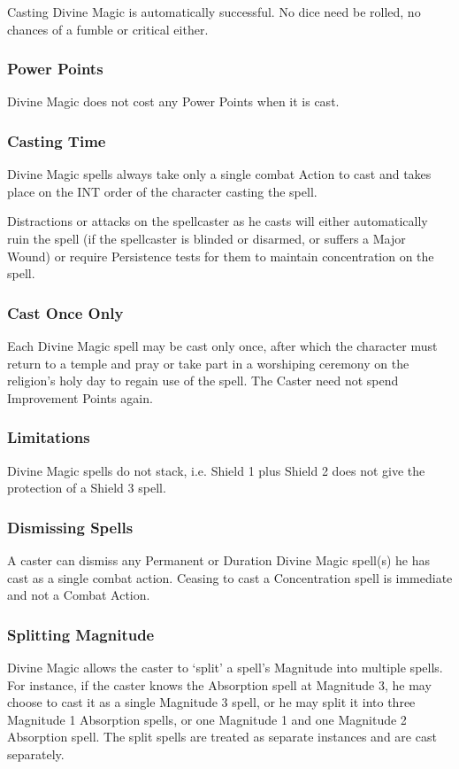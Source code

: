 Casting Divine Magic is automatically successful. No dice need be rolled, no chances of a fumble or critical either.

\subsubsection{Power Points}
Divine Magic does not cost any Power Points when it is cast.

\subsubsection{Casting Time}
Divine Magic spells always take only a single combat Action to cast and takes place on the INT order of the character casting the spell.

Distractions or attacks on the spellcaster as he casts will either automatically ruin the spell (if the spellcaster is blinded or disarmed, or suffers a Major Wound) or require Persistence tests for them to maintain concentration on the spell. 

\subsubsection{Cast Once Only}
Each Divine Magic spell may be cast only once, after which the character must return to a temple and pray or take part in a worshiping ceremony on the religion’s holy day to regain use of the spell. The Caster need not spend Improvement Points again. 

\subsubsection{Limitations}
Divine Magic spells do not stack, i.e. Shield 1 plus Shield 2 does not give the protection of a Shield 3 spell.

\subsubsection{Dismissing Spells}
A caster can dismiss any Permanent or Duration Divine Magic spell(s) he has cast as a single combat action. Ceasing to cast a Concentration spell is immediate and not a Combat Action.


\subsubsection{Splitting Magnitude}
Divine Magic allows the caster to ‘split’ a spell’s Magnitude into multiple spells. For instance, if the caster knows the Absorption spell at Magnitude 3, he may choose to cast it as a single Magnitude 3 spell, or he may split it into three Magnitude 1 Absorption spells, or one Magnitude 1 and one Magnitude 2 Absorption spell. The split spells are treated as separate instances and are cast separately.

